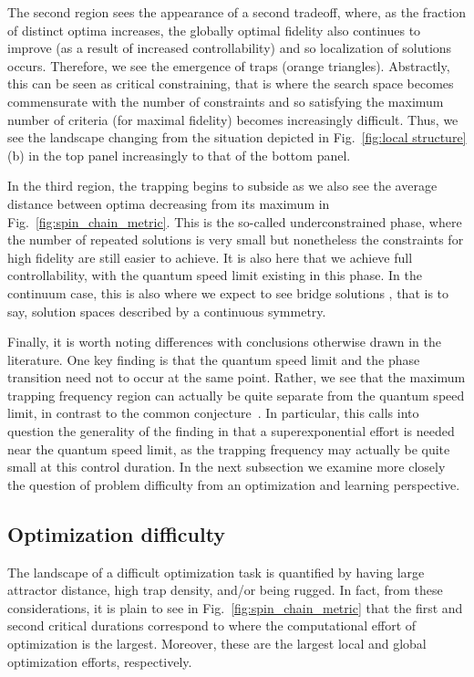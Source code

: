\documentclass[aps, twocolumn,superscriptaddress]{revtex4-1}
\begin{document}
The second region sees the appearance of a second tradeoff,  where, as the fraction of distinct optima increases, the globally optimal fidelity also continues to improve (as a result of increased controllability) and so localization of solutions occurs. Therefore, we see the emergence of traps (orange triangles). Abstractly, this can be seen as critical constraining, that is where the search space becomes commensurate with the number of constraints and so satisfying the maximum number of criteria (for maximal fidelity) becomes increasingly difficult. Thus, we see the landscape changing from the situation depicted in Fig.~\ref{fig:local structure}(b) in the top panel increasingly to that of the bottom panel. 

In the third region, the trapping begins to subside as we also see the average distance between optima decreasing from its maximum in Fig.~\ref{fig:spin_chain_metric}. This is the so-called underconstrained phase, where the number of repeated solutions is very small but nonetheless the constraints for high fidelity are still easier to achieve. It is also here that we achieve full controllability, with the quantum speed limit existing in this phase.  In the continuum case, this is also where we expect to see bridge solutions \cite{shen2006quantum, hsieh2009topology}, that is to say, solution spaces described by a continuous symmetry.

Finally, it is worth noting differences with conclusions otherwise drawn in the literature. One key finding is that the quantum speed limit and the phase transition  need not to occur at the same point.  Rather, we see that the maximum trapping frequency region can actually be quite separate from the quantum speed limit, in contrast to the common conjecture~\cite{bukov2018reinforcement,day2019glassy,tibbetts2012exploring}. In particular, this calls into question the generality of the finding in \cite{tibbetts2012exploring} that a superexponential effort is needed near the quantum speed limit, as the trapping frequency may actually be quite small at this control duration.  In the next subsection we examine more closely the question of problem difficulty from an optimization and learning perspective. 



\subsection{Optimization difficulty} 
 
The landscape of a difficult optimization task is quantified by having large attractor distance, high trap density, and/or being rugged. In fact, from these considerations, it is plain to see in Fig.~\ref{fig:spin_chain_metric} that the first and second critical durations correspond to where the computational effort of optimization is the largest. Moreover, these are the largest local and global optimization efforts, respectively.
\end{document}
